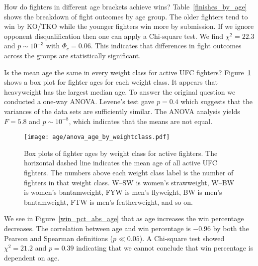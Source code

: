 \clearpage

How do fighters in different age brackets achieve wins?
Table~\ref{finishes_by_age} shows the breakdown of
fight outcomes by age group. The older fighters tend to
win by KO/TKO while the younger fighters win more by
submission. 
If we ignore opponent disqualification then
one can apply a Chi-square test. We find
$\chi^2=22.3$ and $p \sim 10^{-3}$ with $\Phi_c=0.06$. This
indicates that differences in fight outcomes across
the groups are statistically significant.

\begin{center}
\begin{table}[h]

\caption{How wins are achieved by age bracket since January 1, 2005.}
\label{finishes_by_age}
\end{table}
\end{center}

Is the mean age the same in every weight class for active UFC fighters?
Figure~\ref{boxplots_age} shows a box plot for fighter
ages for each weight class. It appears that heavyweight
has the largest median age. To answer the original
question we conducted a one-way ANOVA. Levene's test
gave $p=0.4$ which suggests that the variances of the data
sets are sufficiently similar. The ANOVA analysis yields
$F=5.8$ and $p \sim 10^{-8}$, which indicates that the means
are not equal.

\begin{figure}[h]
\begin{center}
\texttt{[image: age/anova\_age\_by\_weightclass.pdf]}
\caption{Box plots of fighter ages by weight class for active fighters. The horizontal dashed
line indicates the mean age of all active UFC fighters. The
numbers above each weight class label is the number of fighters
in that weight class. W--SW is women's strawweight, W--BW is women's
bantamweight, FYW is men's flyweight, BW is men's bantamweight, FTW
is men's featherweight, and so on.}
\label{boxplots_age}
\end{center}
\end{figure}

\clearpage

We see in Figure~\ref{win_pct_abs_age} that as age increases the win percentage decreases. The
correlation between age and win percentage is $-0.96$ by both
the Pearson and Spearman definitions ($p \ll 0.05$). A Chi-square
test showed $\chi^2=21.2$ and $p=0.39$ indicating that we cannot
conclude that win percentage is dependent on age.

